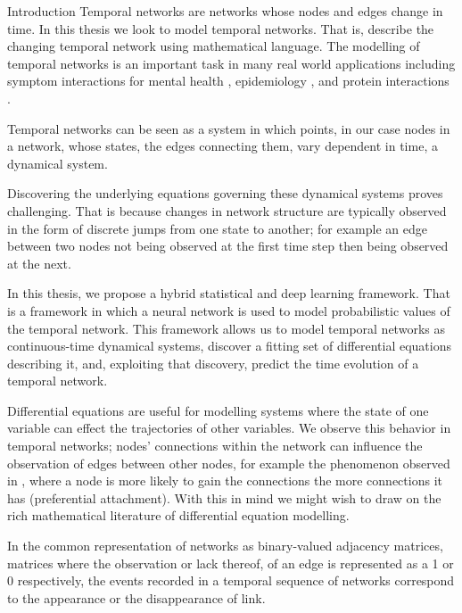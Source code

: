 \documentclass[12pt]{amsart}
\begin{document}
\begin{section}{Introduction}
    Temporal networks are networks whose nodes and edges change in time. In this thesis we look to model temporal networks. That is, describe the changing temporal network using mathematical language. 
    The modelling of temporal networks is an important task in many real world applications including symptom interactions for mental health \cite{jordan2020current,contreras2020temporal}, epidemiology \cite{masuda2013predicting}, and protein interactions \cite{lucas2021inferring,jin2009identifying}.

    Temporal networks can be seen as a system in which points, in our case nodes in a network, whose states, the edges connecting them, vary dependent in time, a dynamical system. 

    Discovering the underlying equations governing these dynamical systems proves challenging. That is because changes in network structure are typically observed in the form of discrete jumps from one state to another; for example an edge between two nodes not being observed at the first time step then being observed at the next.

    In this thesis, we propose a hybrid statistical and deep learning framework. That is a framework in which a neural network is used to model probabilistic values of the temporal network. This framework allows us to model temporal networks as continuous-time dynamical systems, discover a fitting set of differential equations describing it, and, exploiting that discovery, predict the time evolution of a temporal network.

    Differential equations are useful for modelling systems where the state of one variable can effect the trajectories of other variables. We observe this behavior in temporal networks; nodes' connections within the network can influence the observation of edges between other nodes, for example the phenomenon observed in \cite{newman2001clustering,capocci2006preferential}, where a node is more likely to gain the connections the more connections it has (preferential attachment). With this in mind we might wish to draw on the rich mathematical literature of differential equation modelling.

    In the common representation of networks as binary-valued adjacency matrices, matrices where the observation or lack thereof, of an edge is represented as a 1 or 0 respectively, the events recorded in a temporal sequence of networks correspond to the appearance or the disappearance of link.
   

\end{section}
\end{document}
